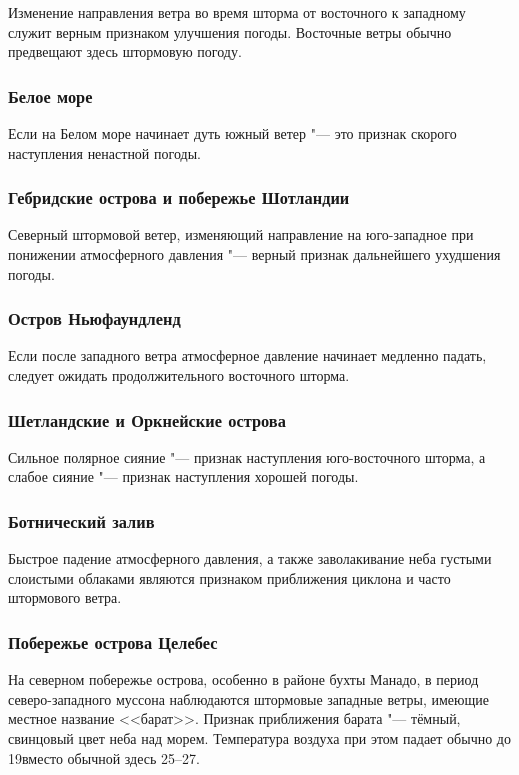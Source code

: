 Изменение направления ветра во время шторма от восточного к западному
служит верным признаком улучшения погоды. Восточные ветры обычно
предвещают здесь штормовую погоду.

\subsubsection{Белое море}

Если на Белом море начинает дуть южный ветер "--- это признак скорого
наступления ненастной погоды.

\subsubsection{Гебридские острова и побережье Шотландии}

Северный штормовой ветер, изменяющий направление на юго-западное при
понижении атмосферного давления "--- верный признак дальнейшего
ухудшения погоды.

\subsubsection{Остров Ньюфаундленд}

Если после западного ветра атмосферное давление начинает медленно
падать, следует ожидать продолжительного восточного шторма.

\subsubsection{Шетландские и Оркнейские острова}

Сильное полярное сияние "--- признак наступления юго-восточного шторма, а
слабое сияние "--- признак наступления хорошей погоды.

\subsubsection{Ботнический залив}

Быстрое падение атмосферного давления, а также заволакивание неба
густыми слоистыми облаками являются признаком приближения циклона и
часто штормового ветра.

\subsubsection{Побережье острова Целебес}

На северном побережье острова, особенно в районе бухты Манадо, в
период северо-западного муссона наблюдаются штормовые западные ветры,
имеющие местное название <<барат>>. Признак приближения барата "--- тёмный,
свинцовый цвет неба над морем. Температура воздуха при этом падает
обычно до 19\grC вместо обычной здесь 25--27\grC.

